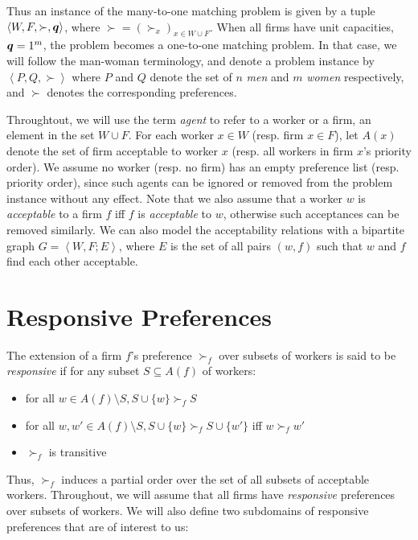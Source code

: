 Thus an instance of the many-to-one matching problem is given by a tuple $\left< W, F, \succ, \boldsymbol{q} \right>$, where $\succ = (\succ_x)_{x \in W \cup F}$. When all firms have unit capacities, \ie $\boldsymbol{q} = 1^m$, the problem becomes a one-to-one matching problem. In that case, we will follow the man-woman terminology, and denote a problem instance by $\left< P, Q, \succ \right>$ where $P$ and $Q$ denote the set of $n$ \textit{men} and $m$ \textit{women} respectively, and $\succ$ denotes the corresponding preferences.

Throughtout, we will use the term \textit{agent} to refer to a worker or a firm, \ie an element in the set $W \cup F$. For each worker $x \in W$ (resp. firm $x \in F$), let $A(x)$ denote the set of firm acceptable to worker $x$ (resp. all workers in firm $x$'s priority order). We assume no worker (resp. no firm) has an empty preference list (resp. priority order), since such agents can be ignored or removed from the problem instance without any effect. Note that we also assume that a worker $w$ is \textit{acceptable} to a firm $f$ iff $f$ is \textit{acceptable} to $w$, otherwise such acceptances can be removed similarly. We can also model the acceptability relations with a bipartite graph $G = \left< W, F; E \right>$, where $E$ is the set of all pairs $(w, f)$ such that $w$ and $f$ find each other acceptable.

\section{Responsive Preferences}

The extension of a firm $f$'s preference $\succ_f$ over subsets of workers is said to be \textit{responsive} if for any subset $S \subseteq A(f)$ of workers:
\begin{itemize}
  \item for all $w \in A(f) \setminus S, S \cup \{w\} \succ_f S$
  \item for all $w, w' \in A(f) \setminus S, S \cup \{w\} \succ_f S \cup \{w'\}$ iff $w \succ_f w'$
  \item $\succ_f$ is transitive
\end{itemize}

Thus, $\succ_f$ induces a partial order over the set of all subsets of acceptable workers. Throughout, we will assume that all firms have \textit{responsive} preferences over subsets of workers. We will also define two subdomains of responsive preferences that are of interest to us:

